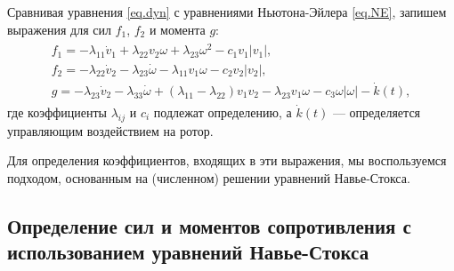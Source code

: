 Сравнивая уравнения \eqref{eq.dyn} с уравнениями Ньютона-Эйлера \eqref{eq.NE}, запишем выражения для сил $f_1$, $f_2$ и момента $g$:
\begin{gather}
	\begin{gathered}\label{eq.forceTorque}
		f_1 = - \lambda_{11}\dot{v}_1 + \lambda_{22} v_2 \omega + \lambda_{23}\omega^2 - c_1 v_1 |v_1|, \\
		f_2 = - \lambda_{22} \dot{v}_2 - \lambda_{23} \dot{\omega} - \lambda_{11} v_1 \omega - c_2 v_2 |v_2|,\\
		g = -\lambda_{23}\dot{v}_2 - \lambda_{33} \dot{\omega} + (\lambda_{11} - \lambda_{22}) v_1 v_2 - \lambda_{23} v_1\omega - c_3 \omega |\omega| - \dot{k}(t),
	\end{gathered}
\end{gather}
где коэффициенты $\lambda_{ij}$ и $c_i$ подлежат определению, а $\dot{k}(t)$ --- определяется управляющим воздействием на ротор.

Для определения коэффициентов, входящих в эти выражения, мы воспользуемся подходом, основанным на (численном) решении уравнений Навье-Стокса.



\subsection{Определение сил и моментов сопротивления с использованием уравнений Навье-Стокса}

%	


